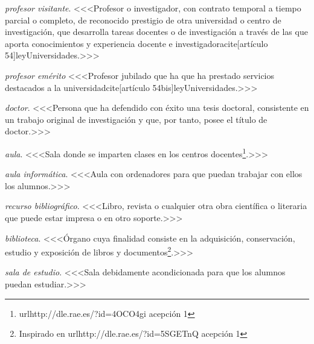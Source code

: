     \item \emph{profesor visitante}. <<<Profesor o investigador, con contrato temporal a tiempo parcial o completo, de reconocido prestigio de otra universidad o centro de investigación, que desarrolla tareas docentes o de investigación a través de las que aporta conocimientos y experiencia docente e investigadoracite[artículo 54]{leyUniversidades}.>>>

    \item \emph{profesor emérito} <<<Profesor jubilado que ha que ha prestado servicios destacados a la universidadcite[artículo 54bis]{leyUniversidades}.>>>

    \item \emph{doctor}. <<<Persona que ha defendido con éxito una tesis doctoral, consistente en un trabajo original de investigación y que, por tanto, posee el título de doctor.>>>

    \item \emph{aula}. <<<Sala donde se imparten clases en los centros docentes\footnote{url{http://dle.rae.es/?id=4OCO4gi} acepción 1}.>>>

    \item \emph{aula informática}. <<<Aula con ordenadores para que puedan trabajar con ellos los alumnos.>>>

    \item \emph{recurso bibliográfico}. <<<Libro, revista o cualquier otra obra científica o literaria que puede estar impresa o en otro soporte.>>>

    \item \emph{biblioteca}. <<<Órgano cuya finalidad consiste en la adquisición, conservación, estudio y exposición de libros y documentos\footnote{Inspirado en url{http://dle.rae.es/?id=5SGETnQ} acepción 1}.>>>

    \item \emph{sala de estudio}. <<<Sala debidamente acondicionada para que los alumnos puedan estudiar.>>> 

{}

